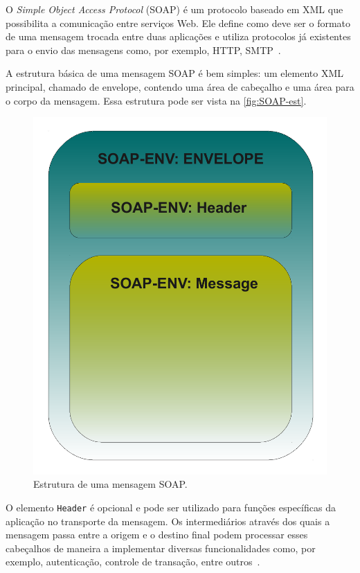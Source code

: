 \documentclass[12pt]{report} %
\begin{document}
		O \textit{Simple Object Access Protocol} (SOAP) é um protocolo baseado em XML que possibilita a comunicação entre serviços Web.
		Ele define como deve ser o formato de uma mensagem trocada entre duas aplicações e utiliza protocolos já existentes para o envio das mensagens como, por exemplo, HTTP, SMTP~\cite{IntroWS}.
		
		A estrutura básica de uma mensagem SOAP é bem simples: um elemento XML principal, chamado de envelope, contendo uma área de cabeçalho e uma área para o corpo da mensagem.
		Essa estrutura pode ser vista na \autoref{fig:SOAP-est}.

		\begin{figure}[!htb]
		\begin{center}
		    \includegraphics[scale=0.3]{imagens/SOAP-est.pdf} 
		    \caption{Estrutura de uma mensagem SOAP.}
		    \label{fig:SOAP-est}
		\end{center}
		\end{figure}

		O elemento \texttt{Header} é opcional e pode ser utilizado para funções específicas da aplicação no transporte da mensagem.
		Os intermediários através dos quais a mensagem passa entre a origem e o destino final podem processar esses cabeçalhos de maneira a implementar diversas funcionalidades como, por exemplo, autenticação, controle de transação, entre outros~\cite{LudwigWS}.
		
\end{document}
